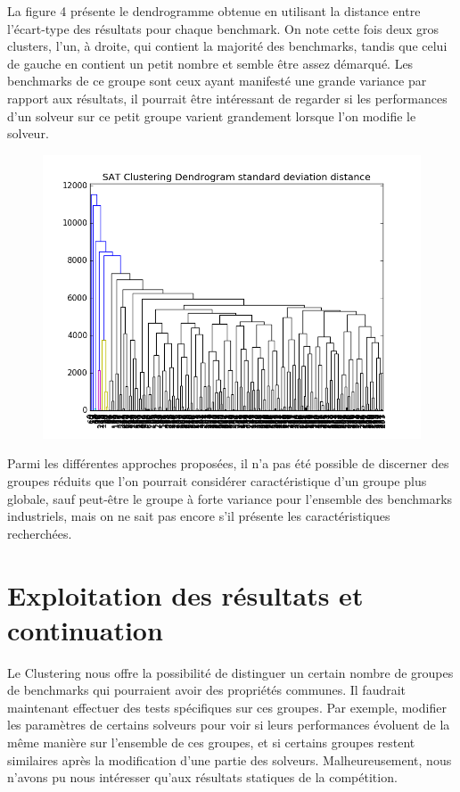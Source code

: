\documentclass[a4paper,11pt]{article}
\begin{document}
La figure 4 présente le dendrogramme obtenue en utilisant la distance entre l’écart-type des résultats pour chaque benchmark. On note cette fois deux gros clusters, l'un, à droite, qui contient la majorité des 
benchmarks, tandis que celui de gauche en contient un petit nombre et semble être assez démarqué. Les benchmarks de ce groupe sont ceux ayant manifesté une grande variance par rapport aux résultats, il pourrait 
être intéressant de regarder si les performances d'un solveur sur ce petit groupe varient grandement lorsque l'on modifie le solveur.

\begin{figure}
  \centering
  \caption{}
  \includegraphics[scale=0.50]{../Pictures/SAT_Clustering_Dendrogram_average_standard_deviation_distance.png}
\end{figure}

Parmi les différentes approches proposées, il n'a pas été possible de discerner des groupes réduits que l'on pourrait considérer caractéristique d'un groupe plus globale, sauf peut-être le groupe à forte 
variance pour l'ensemble des benchmarks industriels, mais on ne sait pas encore s'il présente les caractéristiques recherchées.

\section{Exploitation des résultats et continuation}
\label{sec:validation}
Le Clustering nous offre la possibilité de distinguer un certain nombre de groupes de benchmarks qui pourraient avoir des propriétés communes. Il faudrait maintenant effectuer des tests spécifiques sur ces 
groupes. Par exemple, modifier les paramètres de certains solveurs pour voir si leurs performances évoluent de la même manière sur l'ensemble de ces groupes, et si certains groupes restent similaires après 
la modification d'une partie des solveurs. Malheureusement, nous n'avons pu nous intéresser qu'aux résultats statiques de la compétition.
\end{document}
